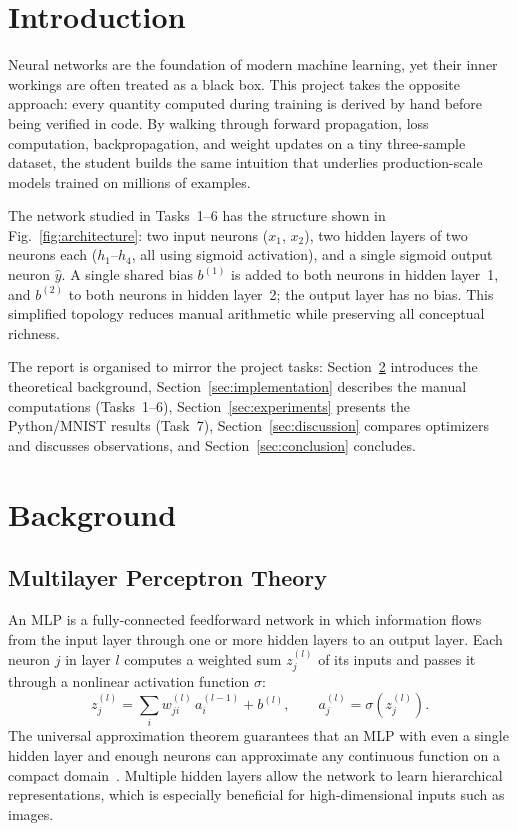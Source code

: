 \documentclass[runningheads]{llncs}
\begin{document}
\section{Introduction}

Neural networks are the foundation of modern machine learning, yet their inner
workings are often treated as a black box. This project takes the opposite
approach: every quantity computed during training is derived by hand before being
verified in code. By walking through forward propagation, loss computation,
backpropagation, and weight updates on a tiny three-sample dataset, the student
builds the same intuition that underlies production-scale models trained on
millions of examples.

The network studied in Tasks~1--6 has the structure shown in
Fig.~\ref{fig:architecture}: two input neurons ($x_1$, $x_2$), two hidden
layers of two neurons each ($h_1$--$h_4$, all using sigmoid activation), and a
single sigmoid output neuron $\hat{y}$. A single shared bias $b^{(1)}$ is added
to both neurons in hidden layer~1, and $b^{(2)}$ to both neurons in hidden
layer~2; the output layer has no bias. This simplified topology reduces manual
arithmetic while preserving all conceptual richness.

The report is organised to mirror the project tasks: Section~\ref{sec:background}
introduces the theoretical background, Section~\ref{sec:implementation} describes
the manual computations (Tasks~1--6), Section~\ref{sec:experiments} presents the
Python/MNIST results (Task~7), Section~\ref{sec:discussion} compares optimizers
and discusses observations, and Section~\ref{sec:conclusion} concludes.

\section{Background}
\label{sec:background}

\subsection{Multilayer Perceptron Theory}

An MLP is a fully-connected feedforward network in which information flows from
the input layer through one or more hidden layers to an output layer. Each
neuron $j$ in layer $l$ computes a weighted sum $z_j^{(l)}$ of its inputs and
passes it through a nonlinear activation function $\sigma$:
\begin{equation}
  z_j^{(l)} = \sum_i w_{ji}^{(l)}\, a_i^{(l-1)} + b^{(l)}, \qquad
  a_j^{(l)} = \sigma\!\left(z_j^{(l)}\right).
\end{equation}
The universal approximation theorem guarantees that an MLP with even a single
hidden layer and enough neurons can approximate any continuous function on a
compact domain~\cite{hornik1989multilayer}. Multiple hidden layers allow the
network to learn hierarchical representations, which is especially beneficial
for high-dimensional inputs such as images.
\end{document}
